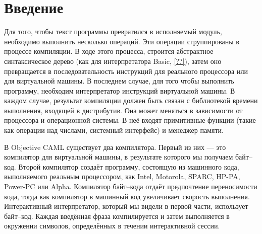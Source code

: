 \section {Введение}

Для того, чтобы текст программы превратился в исполняемый модуль, необходимо
выполнить несколько операций. Эти операции сгруппированы в процессе компиляции.
В ходе этого процесса, строится абстрактное синтаксическое дерево (как для
интерпретатора Basic, \ref{??}), затем оно превращается в последовательность
инструкций для реального процессора или для виртуальной машины. В последнем
случае, для того чтобы выполнить программу, необходим интерпретатор инструкций
виртуальной машины. В каждом случае, результат компиляции должен быть связан с
библиотекой времени выполнения, входящей в дистрибутив. Она может меняться в
зависимости от процессора и операционной системы. В неё входят примитивные
функции (такие как операции над числами, системный интерфейс) и менеджер
памяти.

В Objective CAML существует два компилятора. Первый из них --- это компилятор
для виртуальной машины, в результате которого мы получаем байт--код. Второй
компилятор создаёт программу, состоящую из машинного кода,
выполняемого реальным процессором, как Intel, Motorola, SPARC, HP-PA,
Power-PC или Alpha. Компилятор байт--кода отдаёт предпочтение переносимости
кода, тогда как компилятор в машинный код увеличивает скорость выполнения.
Интерактивный интерпретатор, который мы видели в первой части, использует
байт--код. Каждая введённая фраза компилируется и затем выполняется в окружении
символов, определённых в течении интерактивной сессии.